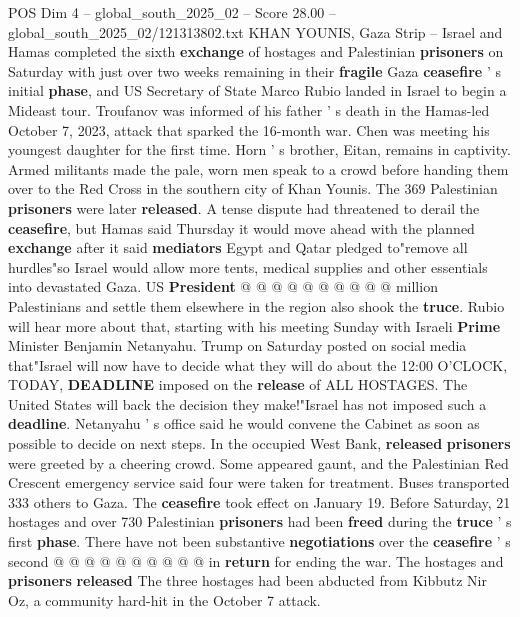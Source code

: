 \begin{textsample}{POS Dim 4 – global\_south\_2025\_02 – Score 28.00 – global\_south\_2025\_02/121313802.txt}  \label{ex:f4_pos_028}
KHAN YOUNIS, Gaza Strip -- Israel and Hamas completed the sixth \textbf{exchange} of hostages and Palestinian \textbf{prisoners} on Saturday with just over two weeks remaining in their \textbf{fragile} Gaza \textbf{ceasefire} ' s initial \textbf{phase}, and US Secretary of State Marco Rubio landed in Israel to begin a Mideast tour.
Troufanov was informed of his father ' s death in the Hamas-led October 7, 2023, attack that sparked the 16-month war.
Chen was meeting his youngest daughter for the first time.
Horn ' s brother, Eitan, remains in captivity.
Armed militants made the pale, worn men speak to a crowd before handing them over to the Red Cross in the southern city of Khan Younis.
The 369 Palestinian \textbf{prisoners} were later \textbf{released}.
A tense dispute had threatened to derail the \textbf{ceasefire}, but Hamas said Thursday it would move ahead with the planned \textbf{exchange} after it said \textbf{mediators} Egypt and Qatar pledged to"remove all hurdles"so Israel would allow more tents, medical supplies and other essentials into devastated Gaza.
US \textbf{President} @ @ @ @ @ @ @ @ @ @ million Palestinians and settle them elsewhere in the region also shook the \textbf{truce}.
Rubio will hear more about that, starting with his meeting Sunday with Israeli \textbf{Prime} Minister Benjamin Netanyahu.
Trump on Saturday posted on social media that"Israel will now have to decide what they will do about the 12:00 O'CLOCK, TODAY, \textbf{DEADLINE} imposed on the \textbf{release} of ALL HOSTAGES.
The United States will back the decision they make!"Israel has not imposed such a \textbf{deadline}.
Netanyahu ' s office said he would convene the Cabinet as soon as possible to decide on next steps.
In the occupied West Bank, \textbf{released} \textbf{prisoners} were greeted by a cheering crowd.
Some appeared gaunt, and the Palestinian Red Crescent emergency service said four were taken for treatment.
Buses transported 333 others to Gaza.
The \textbf{ceasefire} took effect on January 19.
Before Saturday, 21 hostages and over 730 Palestinian \textbf{prisoners} had been \textbf{freed} during the \textbf{truce} ' s first \textbf{phase}.
There have not been substantive \textbf{negotiations} over the \textbf{ceasefire} ' s second @ @ @ @ @ @ @ @ @ @ in \textbf{return} for ending the war.
The hostages and \textbf{prisoners} \textbf{released} The three hostages had been abducted from Kibbutz Nir Oz, a community hard-hit in the October 7 attack.

\end{textsample}

